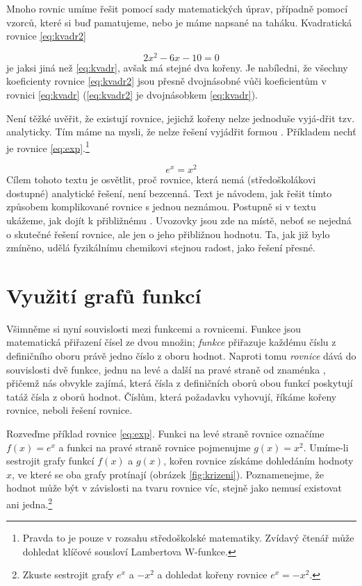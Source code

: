 \documentclass[a4paper,oneside,12pt]{article}
\begin{document}
Mnoho rovnic umíme řešit pomocí sady 
matematických úprav, případně pomocí vzorců, které si buď
pamatujeme, nebo je máme napsané na taháku. Kvadratická 
rovnice \ref{eq:kvadr2}

\begin{equation}
2x^2 - 6x - 10 = 0
\label{eq:kvadr2}
\end{equation}
%
je jaksi jiná než \ref{eq:kvadr}, avšak má stejné dva 
kořeny. Je nabíledni, že všechny koeficienty rovnice 
\ref{eq:kvadr2} jsou přesně dvojnásobné vůči koeficientům 
v rovnici \ref{eq:kvadr} (\ref{eq:kvadr2} je
dvojnásobkem \ref{eq:kvadr}). 

Není těžké uvěřit, že 
existují rovnice, jejichž kořeny nelze jednoduše vyjá-dřit
tzv. analyticky. Tím máme na mysli, že nelze řešení vyjádřit
formou .
Příkladem nechť je rovnice \ref{eq:exp}.\footnote{Pravda
to je pouze 
v rozsahu středoškolské matematiky. Zvídavý čtenář může 
dohledat klíčové sousloví Lambertova W-funkce.} 

\begin{equation}
e^x = x^2
\label{eq:exp}
\end{equation}
%
Cílem tohoto textu je osvětlit, proč rovnice, která nemá
(středoškolákovi dostupné) analytické řešení, není bezcenná. 
Text je návodem, jak řešit tímto způsobem komplikované 
rovnice s jednou neznámou. Postupně si v textu ukážeme, jak 
dojít k přibližnému . Uvozovky jsou zde na místě,
neboť se nejedná o skutečné řešení rovnice, ale jen o jeho
přibližnou hodnotu. Ta, jak již bylo zmíněno, udělá 
fyzikálnímu chemikovi stejnou radost, jako řešení přesné.


\section{Využití grafů funkcí}

Všimněme si nyní souvislosti mezi funkcemi a rovnicemi.
Funkce jsou matematická přiřazení čísel ze dvou množin; 
\emph{funkce} přiřazuje každému číslu z definičního 
oboru právě jedno číslo z oboru hodnot. Naproti tomu 
\emph{rovnice} dává do souvislosti dvě funkce, jednu
na levé a další na pravé straně od znaménka \uv{=}, 
přičemž nás obvykle zajímá, která čísla z definičních oborů 
obou funkcí poskytují tatáž čísla z oborů hodnot. Číslům,
která požadavku vyhovují, říkáme
kořeny rovnice, neboli řešení rovnice.

Rozveďme příklad rovnice \ref{eq:exp}. Funkci na levé straně
rovnice označíme $f(x) = e^x$ a funkci na pravé straně rovnice
pojmenujme $g(x) = x^2$. Umíme-li sestrojit grafy funkcí
$f(x)$ a $g(x)$, kořen rovnice získáme dohledáním hodnoty
$x$, ve které se oba grafy protínají 
(obrázek \ref{fig:krizeni}). Poznamenejme,
že hodnot může být v závislosti na tvaru rovnice víc, stejně
jako nemusí existovat ani jedna.\footnote{Zkuste sestrojit
grafy $e^x$ a $-x^2$ a dohledat
kořeny rovnice $e^x = -x^2$.}
\end{document}
